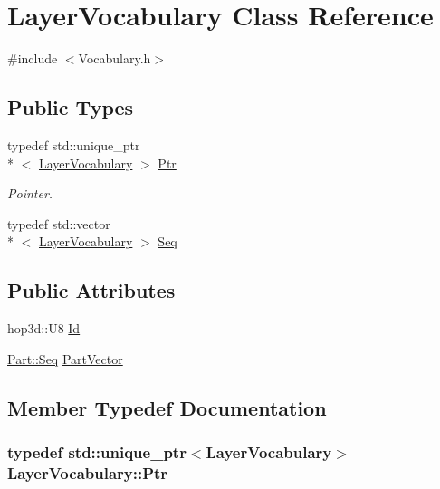 \hypertarget{class_layer_vocabulary}{\section{Layer\-Vocabulary Class Reference}
\label{class_layer_vocabulary}
}


{\ttfamily \#include $<$Vocabulary.\-h$>$}

\subsection*{Public Types}
\begin{DoxyCompactItemize}
\item 
typedef std\-::unique\-\_\-ptr\\*
$<$ \hyperlink{class_layer_vocabulary}{Layer\-Vocabulary} $>$ \hyperlink{class_layer_vocabulary_adc324deadcd03d2844a300b98421a39b}{Ptr}
\begin{DoxyCompactList}\small\item\em Pointer. \end{DoxyCompactList}\item 
typedef std\-::vector\\*
$<$ \hyperlink{class_layer_vocabulary}{Layer\-Vocabulary} $>$ \hyperlink{class_layer_vocabulary_a6098bd61090934286a749873181b5077}{Seq}
\end{DoxyCompactItemize}
\subsection*{Public Attributes}
\begin{DoxyCompactItemize}
\item 
hop3d\-::\-U8 \hyperlink{class_layer_vocabulary_a6f7881278bd7896751e23ae258bcbcb9}{Id}
\item 
\hyperlink{class_part_a9cbb31df0bd4615cb133293acd55a938}{Part\-::\-Seq} \hyperlink{class_layer_vocabulary_a5a33255cbfcdbf3a63fd78a4003bd865}{Part\-Vector}
\end{DoxyCompactItemize}


\subsection{Member Typedef Documentation}
\hypertarget{class_layer_vocabulary_adc324deadcd03d2844a300b98421a39b}{
\subsubsection[{Ptr}]{\setlength{\rightskip}{0pt plus 5cm}typedef std\-::unique\-\_\-ptr$<${\bf Layer\-Vocabulary}$>$ {\bf Layer\-Vocabulary\-::\-Ptr}}}\label{class_layer_vocabulary_adc324deadcd03d2844a300b98421a39b}


